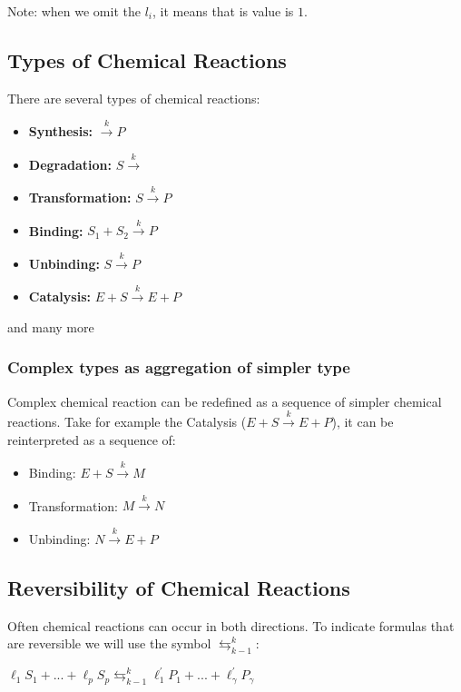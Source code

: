 Note: when we omit the $l_i$, it means that is value is $1$.

\subsection{Types of Chemical Reactions}

There are several types of chemical reactions:

\begin{itemize}
    \item \textbf{Synthesis:} $\xrightarrow{k} P$
    \item \textbf{Degradation:} $S \xrightarrow{k}$
    \item \textbf{Transformation:} $S \xrightarrow{k} P$
    \item \textbf{Binding:} $S_1 + S_2 \xrightarrow{k} P$
    \item \textbf{Unbinding:} $S \xrightarrow{k} P$
    \item \textbf{Catalysis:} $E + S \xrightarrow{k} E + P$
\end{itemize}
and many more

\subsubsection{Complex types as aggregation of simpler type}
Complex chemical reaction can be redefined as a sequence of simpler chemical reactions. Take for example the Catalysis ($E + S \xrightarrow{k} E + P$), it can be reinterpreted as a sequence of:

\begin{itemize}
    \item Binding: $E + S \xrightarrow{k} M$
    \item Transformation: $M \xrightarrow{k} N$
    \item Unbinding: $N \xrightarrow{k} E + P$
\end{itemize}

\subsection{Reversibility of Chemical Reactions}
Often chemical reactions can occur in both directions. To indicate formulas that are reversible we will use the symbol $\leftrightarrows^{k}_{k-1}$:

\begin{center}
    $\ell_1 S_1 + ... + \ell_p S_p \leftrightarrows^{k}_{k-1} \ell^{'}_1 P_1 + ... + \ell^{'}_\gamma P_\gamma$
\end{center}

